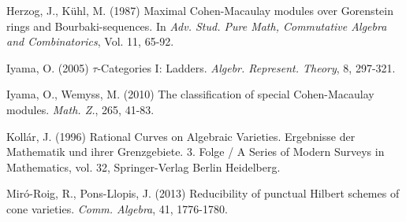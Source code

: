 \documentclass{amsart}[12pt]
\theoremstyle{definition}
\theoremstyle{remark}
\numberwithin{equation}{section}
\begin{document}
\begin{thebibliography}{00}
Herzog, J., K\"{u}hl, M. (1987) Maximal Cohen-Macaulay modules over Gorenstein rings and Bourbaki-sequences. In \textit{Adv. Stud. Pure Math, Commutative Algebra and Combinatorics}, Vol. 11, 65-92. 

Iyama, O. (2005) $\tau$-Categories I: Ladders. \textit{Algebr. Represent. Theory}, 8, 297-321.

Iyama, O., Wemyss, M. (2010) The classification of special Cohen-Macaulay modules. \textit{Math. Z.}, 265, 41-83.

Koll\'ar, J. (1996) Rational Curves on Algebraic Varieties. Ergebnisse der Mathematik und ihrer Grenzgebiete. 3. Folge / A Series of Modern Surveys in Mathematics, vol. 32, Springer-Verlag Berlin Heidelberg.

Mir\'o-Roig, R., Pons-Llopis, J. (2013) Reducibility of punctual Hilbert schemes of cone varieties. \textit{Comm. Algebra}, 41, 1776-1780.





\end{thebibliography}
%
\end{document}
